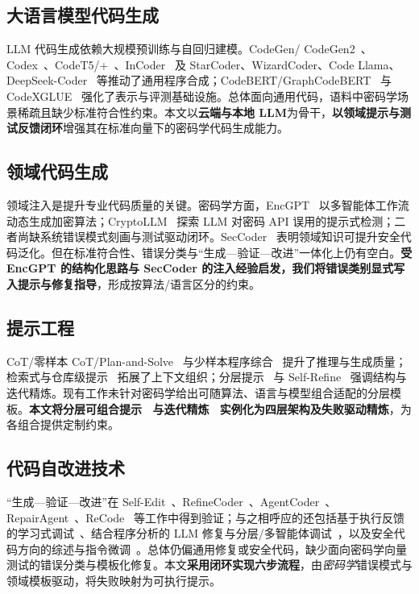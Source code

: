 \documentclass[runningheads]{llncs}
\begin{document}
\subsection{大语言模型代码生成}
LLM 代码生成依赖大规模预训练与自回归建模。CodeGen/ CodeGen2~\cite{codegen1,codegen2}、Codex~\cite{codex}、CodeT5/+~\cite{codet5,codet5plus}、InCoder~\cite{incoder} 及 StarCoder、WizardCoder、Code Llama、DeepSeek-Coder~\cite{starcoder,wizardcoder,codellama,deepseekcoder} 等推动了通用程序合成；CodeBERT/GraphCodeBERT~\cite{codebert,graphcodebert} 与 CodeXGLUE~\cite{codexglue} 强化了表示与评测基础设施。总体面向通用代码，语料中密码学场景稀疏且缺少标准符合性约束。本文以\textbf{云端与本地 LLM}为骨干，\textbf{以领域提示与测试反馈闭环}增强其在标准向量下的密码学代码生成能力。

\subsection{领域代码生成}
领域注入是提升专业代码质量的关键。密码学方面，EncGPT~\cite{encgpt} 以多智能体工作流动态生成加密算法；CryptoLLM~\cite{cryptollm} 探索 LLM 对密码 API 误用的提示式检测；二者尚缺系统错误模式刻画与测试驱动闭环。SecCoder~\cite{seccoder} 表明领域知识可提升安全代码泛化。但在标准符合性、错误分类与“生成—验证—改进”一体化上仍有空白。\textbf{受 EncGPT 的结构化思路与 SecCoder 的注入经验启发，我们将错误类别显式写入提示与修复指导}，形成按算法/语言区分的约束。

\subsection{提示工程}
CoT/零样本 CoT/Plan-and-Solve~\cite{cot,zeroshotcot,planandsolve} 与少样本程序综合~\cite{fewshot,progsynprompt} 提升了推理与生成质量；检索式与仓库级提示~\cite{coderagbench,repolevelprompt} 拓展了上下文组织；分层提示~\cite{hierprompt} 与 Self-Refine~\cite{selfrefine} 强调结构与迭代精炼。现有工作未针对密码学给出可随算法、语言与模型组合适配的分层模板。\textbf{本文将分层可组合提示~\cite{hierprompt} 与迭代精炼~\cite{selfrefine} 实例化为四层架构及失败驱动精炼}，为各组合提供定制约束。

\subsection{代码自改进技术}
“生成—验证—改进”在 Self-Edit~\cite{selfedit}、RefineCoder~\cite{refinecoder}、AgentCoder~\cite{agentcoder}、RepairAgent~\cite{repairagent}、ReCode~\cite{recode} 等工作中得到验证；与之相呼应的还包括基于执行反馈的学习式调试~\cite{cycle,rlef}、结合程序分析的 LLM 修复与分层/多智能体调试~\cite{ledex,li2023,rgd,unidebugger,tang2024}，以及安全代码方向的综述与指令微调~\cite{secsurvey,securecodegen}。总体仍偏通用修复或安全代码，缺少面向密码学向量测试的错误分类与模板化修复。本文\textbf{采用闭环实现六步流程}，由\emph{密码学}错误模式与领域模板驱动，将失败映射为可执行提示。
\end{document}
